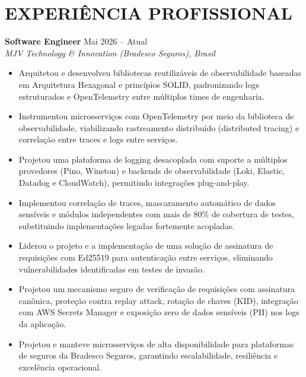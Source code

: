 \documentclass[10pt,letterpaper]{article}
\begin{document}
\section{EXPERIÊNCIA PROFISSIONAL}

\textbf{Software Engineer} \hfill Mai 2026 -- Atual \\
\textit{MJV Technology \& Innovation (Bradesco Seguros), Brasil}
\begin{itemize}[leftmargin=*, itemsep=2pt]
    \item Arquitetou e desenvolveu bibliotecas reutilizáveis de observabilidade baseadas em Arquitetura Hexagonal e princípios SOLID, padronizando logs estruturados e OpenTelemetry entre múltiplos times de engenharia.
    \item Instrumentou microsserviços com OpenTelemetry por meio da biblioteca de observabilidade, viabilizando rastreamento distribuído (distributed tracing) e correlação entre traces e logs entre serviços.
    \item Projetou uma plataforma de logging desacoplada com suporte a múltiplos provedores (Pino, Winston) e backends de observabilidade (Loki, Elastic, Datadog e CloudWatch), permitindo integrações plug-and-play.
    \item Implementou correlação de traces, mascaramento automático de dados sensíveis e módulos independentes com mais de 80\% de cobertura de testes, substituindo implementações legadas fortemente acopladas.
    \item Liderou o projeto e a implementação de uma solução de assinatura de requisições com Ed25519 para autenticação entre serviços, eliminando vulnerabilidades identificadas em testes de invasão.
    \item Projetou um mecanismo seguro de verificação de requisições com assinatura canônica, proteção contra replay attack, rotação de chaves (KID), integração com AWS Secrets Manager e exposição zero de dados sensíveis (PII) nos logs da aplicação.
    \item Projetou e manteve microsserviços de alta disponibilidade para plataformas de seguros da Bradesco Seguros, garantindo escalabilidade, resiliência e excelência operacional.
\end{itemize}
\end{document}
